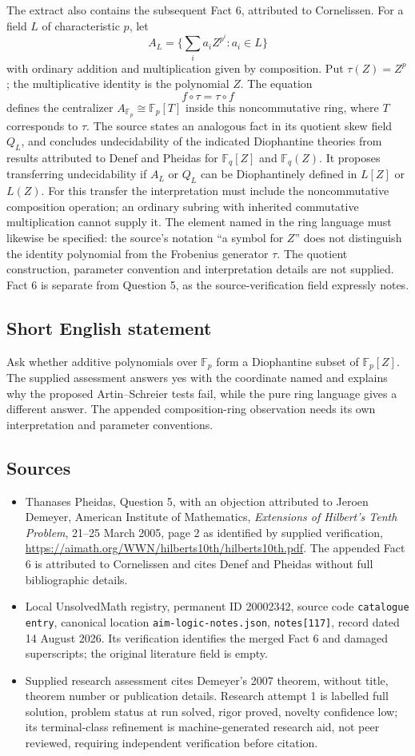 \documentclass[11pt]{article}
\newcommand{\F}{\mathbb{F}}
\begin{document}
The extract also contains the subsequent Fact 6, attributed to Cornelissen. For a field $L$ of characteristic $p$, let
\[
 A_L=\bigl\{\textstyle\sum_i a_i Z^{p^i}:a_i\in L\bigr\}
\]
with ordinary addition and multiplication given by composition. Put $\tau(Z)=Z^p$; the multiplicative identity is the polynomial $Z$. The equation
\[
 f\circ\tau=\tau\circ f
\]
defines the centralizer $A_{\F_p}\cong\F_p[T]$ inside this noncommutative ring, where $T$ corresponds to $\tau$. The source states an analogous fact in its quotient skew field $Q_L$, and concludes undecidability of the indicated Diophantine theories from results attributed to Denef and Pheidas for $\F_q[Z]$ and $\F_q(Z)$. It proposes transferring undecidability if $A_L$ or $Q_L$ can be Diophantinely defined in $L[Z]$ or $L(Z)$. For this transfer the interpretation must include the noncommutative composition operation; an ordinary subring with inherited commutative multiplication cannot supply it. The element named in the ring language must likewise be specified: the source's notation ``a symbol for $Z$'' does not distinguish the identity polynomial from the Frobenius generator $\tau$. The quotient construction, parameter convention and interpretation details are not supplied. Fact 6 is separate from Question 5, as the source-verification field expressly notes.
\subsection{Short English statement}
Ask whether additive polynomials over $\F_p$ form a Diophantine subset of $\F_p[Z]$. The supplied assessment answers yes with the coordinate named and explains why the proposed Artin--Schreier tests fail, while the pure ring language gives a different answer. The appended composition-ring observation needs its own interpretation and parameter conventions.
\subsection{Sources}
\begin{itemize}
\item Thanases Pheidas, Question 5, with an objection attributed to Jeroen Demeyer, American Institute of Mathematics, \emph{Extensions of Hilbert's Tenth Problem}, 21--25 March 2005, page 2 as identified by supplied verification, \url{https://aimath.org/WWN/hilberts10th/hilberts10th.pdf}. The appended Fact 6 is attributed to Cornelissen and cites Denef and Pheidas without full bibliographic details.
\item Local UnsolvedMath registry, permanent ID 20002342, source code \texttt{catalogue entry}, canonical location \texttt{aim-logic-notes.json}, \texttt{notes[117]}, record dated 14 August 2026. Its verification identifies the merged Fact 6 and damaged superscripts; the original literature field is empty.
\item Supplied research assessment cites Demeyer's 2007 theorem, without title, theorem number or publication details. Research attempt 1 is labelled full solution, problem status at run solved, rigor proved, novelty confidence low; its terminal-class refinement is machine-generated research aid, not peer reviewed, requiring independent verification before citation.
\end{itemize}
\end{document}
